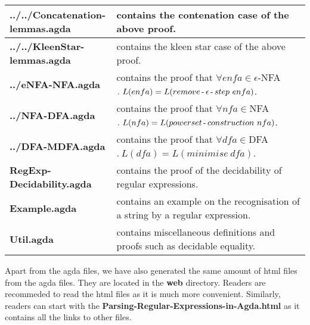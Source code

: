 \begin{center}
\begin{longtable}{| p{5.2cm} | p{8.3cm} |}
\textbf{../../Concatenation-lemmas.agda} & contains the
contenation case of the above proof. \\ \hline
\textbf{../../KleenStar-lemmas.agda} & contains the
kleen star case of the above proof. \\ \hline
\textbf{../eNFA-NFA.agda} & contains the proof that \(\forall
enfa\in \epsilon\)-NFA\(.\ L(enfa) = L(remove\operatorname{-}\epsilon\operatorname{-}
step\ enfa)\). \\ \hline
\textbf{../NFA-DFA.agda} & contains the proof that \(\forall
nfa\in\)NFA\(.\ L(nfa) = L(powerset\hyphen construction\ nfa)\). \\ \hline
\textbf{../DFA-MDFA.agda} & contains the proof that \(\forall
dfa\in\)DFA\(.\ L(dfa) = L(minimise\ dfa)\). \\ \hline
\textbf{RegExp-Decidability.agda} & contains the proof of the
decidability of regular expressions. \\ \hline
\textbf{Example.agda} & contains an example on the recognisation of a
string by a regular expression. \\ \hline
\textbf{Util.agda} & contains miscellaneous definitions and proofs
such as decidable equality. \\ \hline
\end{longtable}
\end{center}

\par Apart from the agda files, we have also generated the same amount
of html files from the agda files. They are located in the \textbf{web} directory. Readers are
recommeded to read the html files as it is much more
convenient. Similarly, readers can start with the
\textbf{Parsing-Regular-Expressions-in-Agda.html} as it contains all
the links to other files. 